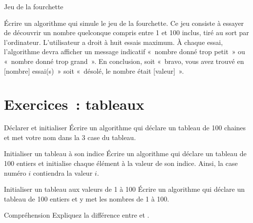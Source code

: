 	\begin{Exercice}{Jeu de la fourchette}

		Écrire un algorithme qui simule le jeu de la
		fourchette. Ce jeu consiste à essayer de découvrir un nombre quelconque
		compris entre 1 et 100 inclus, tiré au sort par l’ordinateur. 
		L’utilisateur a droit à huit essais
		maximum. À chaque essai, l’algorithme devra afficher un message
		indicatif «~nombre donné trop petit~» ou «~nombre donné trop grand~».
		En conclusion, soit «~bravo, vous avez trouvé en [nombre] essai(s)~» soit
		«~désolé, le nombre était [valeur]~».
	\end{Exercice}







\clearpage
\section{Exercices~: tableaux}


	\begin{Exercice}{Déclarer et initialiser}
		Écrire un algorithme qui déclare un tableau de 100 chaines
		et met votre nom dans la 3\ieme{} case du tableau.
	\end{Exercice}

	\begin{Exercice}{Initialiser un tableau à son indice}
		Écrire un algorithme qui déclare un tableau de 100 entiers
		et initialise chaque élément à la valeur de son indice.
		Ainsi, la case numéro $i$ contiendra la valeur $i$.
	\end{Exercice}

	\begin{Exercice}{Initialiser un tableau aux valeurs de 1 à 100}
		Écrire un algorithme qui déclare un tableau de 100 entiers
		et y met les nombres de 1 à 100.
	\end{Exercice}

	\begin{Exercice}{Compréhension}
		Expliquez la différence entre 
		et .
	\end{Exercice}



